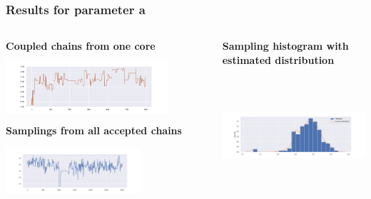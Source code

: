 \documentclass{beamer}
\begin{document}
\begin{frame}
	\frametitle{Results for parameter a}
	\begin{columns}
		\begin{column}{0.4\textwidth}
			{\scriptsize \textbf{Coupled chains from one core}}\\
			\includegraphics[width=6cm,height=2.5cm]{gk_all_pack/gk_all_chain_meeeting_0}
			\vspace{0.2cm}
			{\scriptsize \textbf{Samplings from all accepted chains }}\\
			\includegraphics[width=5cm,height=2.5cm]{gk_all_pack/gk_all_sampling_0}
		\end{column}
		\begin{column}{0.4\textwidth}
			{	\scriptsize \textbf{Sampling histogram with estimated distribution}}\\
			\includegraphics[width=6cm,height=5cm]{gk_all_pack/gk_all_histogram_kernel_0}
			
		\end{column}
	\end{columns}
	\end{frame}
\end{document}
